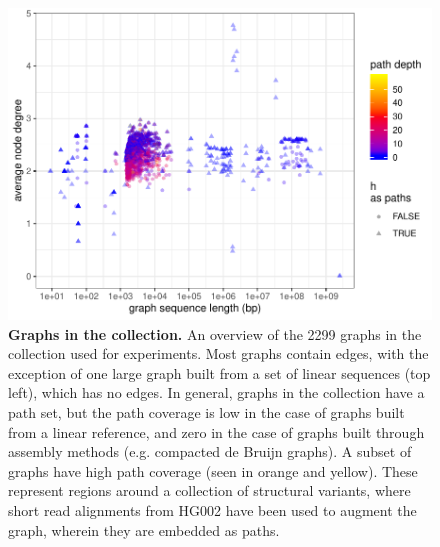 \documentclass{article}
\begin{document}
\begin{figure} %
  \centering
  \includegraphics[width=1.0\textwidth]{figures/graph_summary.pdf}
  \caption{
    \label{fig:graphprops}
    \textbf{Graphs in the collection.}
    An overview of the 2299 graphs in the collection used for experiments.
    Most graphs contain edges, with the exception of one large graph built from a set of linear sequences (top left), which has no edges.
    In general, graphs in the collection have a path set, but the path coverage is low in the case of graphs built from a linear reference, and zero in the case of graphs built through assembly methods (e.g. compacted de Bruijn graphs).
    A subset of graphs have high path coverage (seen in orange and yellow).
    These represent regions around a collection of structural variants, where short read alignments from HG002 have been used to augment the graph, wherein they are embedded as paths.
    }
\end{figure}
  
\end{document}
